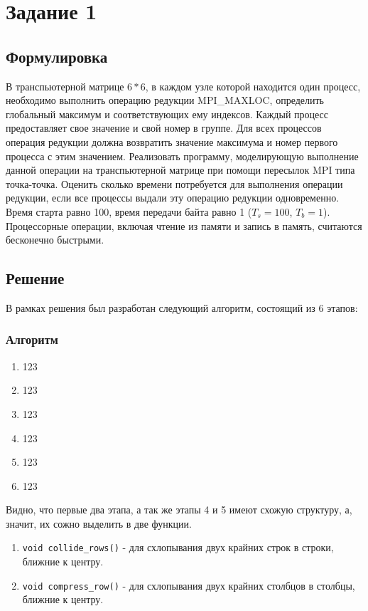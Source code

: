 \section*{Задание 1}
\subsection*{Формулировка}
В транспьютерной матрице $6*6$, в каждом узле которой находится один процесс, необходимо выполнить операцию редукции MPI\_MAXLOC, определить глобальный максимум и соответствующих ему индексов.
Каждый процесс предоставляет свое значение и свой номер в группе. Для всех процессов операция редукции должна возвратить значение максимума и номер первого процесса с этим значением.
Реализовать программу, моделирующую выполнение данной операции на транспьютерной матрице при помощи пересылок MPI типа точка-точка.
Оценить сколько времени потребуется для выполнения операции редукции, если все процессы выдали эту операцию редукции одновременно. Время старта равно 100, время передачи байта равно 1 ($T_s=100$, $T_b=1$). Процессорные операции, включая чтение из памяти и запись в память, считаются бесконечно быстрыми.
\subsection*{Решение}
В рамках решения был разработан следующий алгоритм, состоящий из 6 этапов:
\subsubsection*{Алгоритм}
\begin{enumerate}
    \item 123
    \item 123
    \item 123
    \item 123
    \item 123
    \item 123
\end{enumerate}
Видно, что первые два этапа, а так же этапы 4 и 5 имеют схожую структуру, а, значит, их сожно выделить в две функции.
\begin{enumerate}
    \item \texttt{void collide_rows()} - для схлопывания двух крайних строк в строки, ближние к центру.
    \item \texttt{void compress_row()} - для схлопывания двух крайних столбцов в столбцы, ближние к центру.
\end{enumerate}

